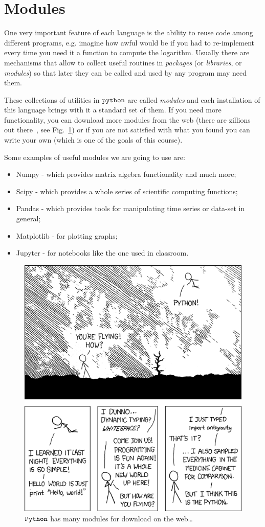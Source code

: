 \section{Modules}\label{modules}

One very important feature of each language is the ability to reuse code among 
different programs, e.g. imagine how awful would be if you had to re-implement every time 
you need it a function to compute the logarithm.
Usually there are mechanisms that allow to collect useful routines in \emph{packages} 
(or \emph{libraries}, or \emph{modules}) so that later they can be called and used by any 
program may need them.

These collections of utilities in \(\tt{python}\) are called \emph{modules} and each installation 
of this language brings with it a standard set of them. If you need more functionality, you can 
download more modules from the web (there are zillions out there~\cite{modules}, see Fig.~\ref{fig:fancy_module})
or if you are 
not satisfied with what you found you can write your own (which is one of the goals of this course).

Some examples of useful modules we are going to use are:

\begin{itemize}
\tightlist
\item
  Numpy - which provides matrix algebra functionality and much more;
\item
  Scipy - which provides a whole series of scientific computing
  functions;
\item
  Pandas - which provides tools for manipulating time series or data-set
  in general;
\item
  Matplotlib - for plotting graphs;
\item
  Jupyter - for notebooks like the one used in classroom.
\end{itemize}

\begin{figure}
\centering
\includegraphics[width=0.5\linewidth]{figures/python.png}
\caption{$\tt{Python}$ has many modules for download on the web\ldots{}}
\label{fig:fancy_module}
\end{figure}

